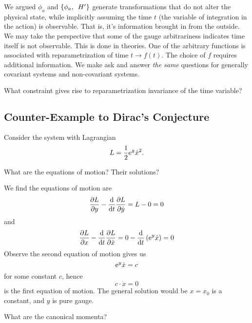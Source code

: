 We argued $\phi_{a}$ and $\left\{\phi_{a},\enspace H'\right\}$
generate transformations that do not alter the physical state, while implicitly
assuming the time $t$ (the variable of integration in the action) is
observable. That is, it's information brought in from the outside. We
may take the perspective that some of the gauge arbitrariness indicates
time itself is not observable. This is done in 
 theories. One of the arbitrary functions is
associated with reparametrization of time $t\to f(t)$. The choice of $f$
requires additional information. We make ask and answer \emph{the same}
questions for generally covariant systems and non-covariant
systems.

 What constraint gives rise to reparametrization invariance
of the time variable?

\subsection{Counter-Example to Dirac's Conjecture}
Consider the system with Lagrangian
\begin{equation}
L = \frac{1}{2}\mathrm{e}^{y}\dot{x}^{2}.
\end{equation}

 What are the equations of motion? Their solutions?

\begin{soln}
We find the equations of motion are
\begin{equation}
\frac{\partial L}{\partial y} - \frac{\mathrm{d}}{\mathrm{d} t}\frac{\partial L}{\partial\dot{y}}= L - 0 = 0
\end{equation}
and
\begin{equation}
\frac{\partial L}{\partial x} - \frac{\mathrm{d}}{\mathrm{d} t}\frac{\partial L}{\partial\dot{x}}
= 0 -\frac{\mathrm{d}}{\mathrm{d} t}\left(\mathrm{e}^{y}\dot{x}\right) = 0
\end{equation}
Observe the second equation of motion gives us
\begin{equation}
\mathrm{e}^{y}\dot{x} = c
\end{equation}
for some constant $c$, hence
\begin{equation}
c\cdot\dot{x} = 0
\end{equation}
is the first equation of motion. The general solution would be $x=x_{0}$
is a constant, and $y$ is pure gauge.
\end{soln}

 What are the canonical momenta?

